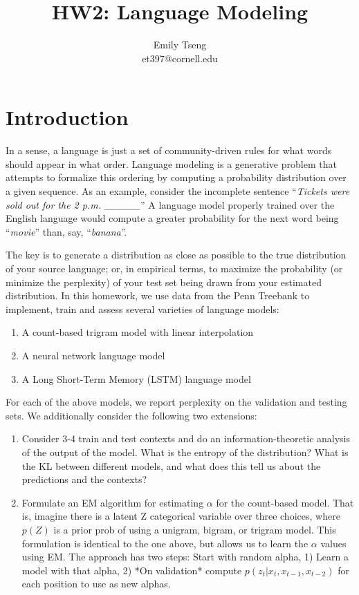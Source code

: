 \documentclass[11pt]{article}
\title{HW2: Language Modeling}
\author{Emily Tseng \\ et397@cornell.edu}
\begin{document}
\maketitle{}
\section{Introduction}

In a sense, a language is just a set of community-driven rules for what words should appear in what order. Language modeling is a generative problem that attempts to formalize this ordering by computing a probability distribution over a given sequence. As an example, consider the incomplete sentence ``\textit{Tickets were sold out for the 2 p.m. \_\_\_\_\_}'' A language model properly trained over the English language would compute a greater probability for the next word being ``\textit{movie}'' than, say, ``\textit{banana}''. 

The key is to generate a distribution as close as possible to the true distribution of your source language; or, in empirical terms, to maximize the probability (or minimize the perplexity) of your test set being drawn from your estimated distribution. In this homework, we use data from the Penn Treebank \citep{marcus-etal-1993-building} to implement, train and assess several varieties of language models:

\begin{enumerate}
  \item A count-based trigram model with linear interpolation
  \item A neural network language model \citep{bengio2003neural}
  \item A Long Short-Term Memory (LSTM) language model \citep{zaremba2014recurrent}
\end{enumerate}

For each of the above models, we report perplexity on the validation and testing sets. We additionally consider the following two extensions:

\begin{enumerate}
  \item Consider 3-4 train and test contexts and do an information-theoretic analysis of the output of the model. What is the entropy of the distribution? What is the KL between different models, and what does this tell us about the predictions and the contexts?
  \item Formulate an EM algorithm for estimating $\alpha$ for the count-based model. That is, imagine there is a latent Z categorical variable over three choices, where $p(Z)$ is a prior prob of using a unigram, bigram, or trigram model. This formulation is identical to the one above, but allows us to learn the $\alpha$ values using EM. The approach has two steps: Start with random alpha, 1) Learn a model with that alpha, 2) *On validation* compute $p(z_t | x_t, x_{t-1}, x_{t-2})$ for each position to use as new alphas. 
\end{enumerate}
\end{document}
